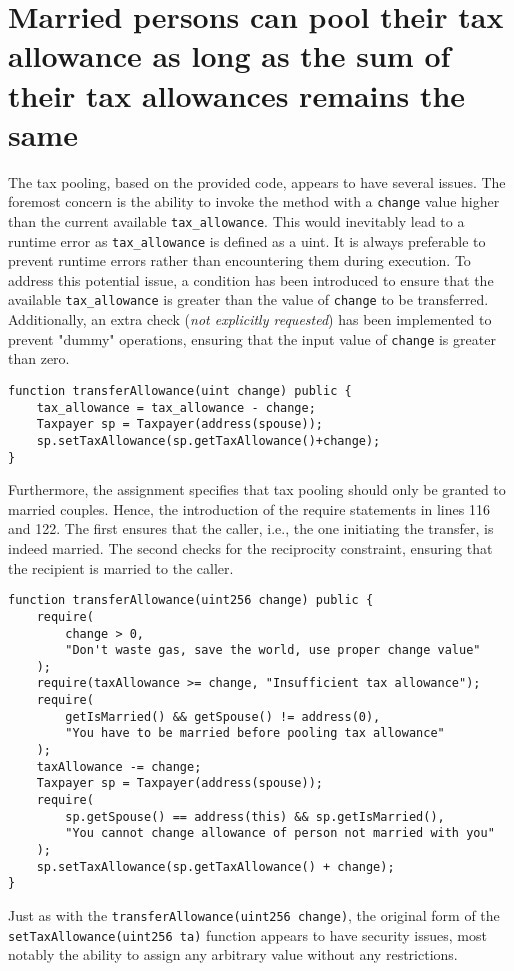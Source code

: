 \documentclass{article}
\begin{document}
\section{Married persons can pool their tax allowance as long as the sum of their tax allowances remains the same}
The tax pooling, based on the provided code, appears to have several issues. The foremost concern is the ability to invoke the method with a \texttt{change} value higher than the current available \texttt{tax\_allowance}. This would inevitably lead to a runtime error as \texttt{tax\_allowance} is defined as a uint. It is always preferable to prevent runtime errors rather than encountering them during execution.
To address this potential issue, a condition has been introduced to ensure that the available \texttt{tax\_allowance} is greater than the value of \texttt{change} to be transferred. Additionally, an extra check (\textit{not explicitly requested}) has been implemented to prevent "dummy" operations, ensuring that the input value of \texttt{change} is greater than zero.
\begin{verbatim}
function transferAllowance(uint change) public {
    tax_allowance = tax_allowance - change;
    Taxpayer sp = Taxpayer(address(spouse));
    sp.setTaxAllowance(sp.getTaxAllowance()+change);
}
\end{verbatim}
Furthermore, the assignment specifies that tax pooling should only be granted to married couples. Hence, the introduction of the require statements in lines 116 and 122. The first ensures that the caller, i.e., the one initiating the transfer, is indeed married. The second checks for the reciprocity constraint, ensuring that the recipient is married to the caller.
\begin{verbatim}
function transferAllowance(uint256 change) public {
    require(
        change > 0,
        "Don't waste gas, save the world, use proper change value"
    );
    require(taxAllowance >= change, "Insufficient tax allowance");
    require(
        getIsMarried() && getSpouse() != address(0),
        "You have to be married before pooling tax allowance"
    );
    taxAllowance -= change;
    Taxpayer sp = Taxpayer(address(spouse));
    require(
        sp.getSpouse() == address(this) && sp.getIsMarried(),
        "You cannot change allowance of person not married with you"
    );
    sp.setTaxAllowance(sp.getTaxAllowance() + change);
}
\end{verbatim}
Just as with the \texttt{transferAllowance(uint256 change)}, the original form of the \texttt{setTaxAllowance(uint256 ta)} function appears to have security issues, most notably the ability to assign any arbitrary value without any restrictions.
\end{document}
